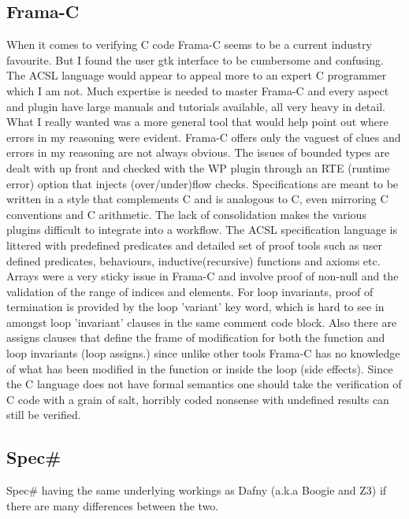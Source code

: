 \documentclass[10pt]{article} %
\begin{document}
\subsection{Frama-C}
	When it comes to verifying C code Frama-C seems to be a current industry favourite. But I found the user gtk interface to be cumbersome and confusing. The ACSL language would appear to appeal more to an expert C programmer which I am not. Much expertise is needed to master Frama-C and every aspect and plugin have large manuals and tutorials available, all very heavy in detail. What I really wanted was a more general tool that would help point out where errors in my reasoning were evident. Frama-C offers only the vaguest of clues and errors in my reasoning are not always obvious. The issues of bounded types are dealt with up front and checked with the WP plugin through an RTE (runtime error) option that injects (over\slash under)flow checks. Specifications are meant to be written in a style that complements C and is analogous to C, even mirroring C conventions and C arithmetic. The lack of consolidation makes the various plugins difficult to integrate into a workflow. The ACSL specification language is littered with predefined predicates and detailed set of proof tools such as user defined predicates, behaviours, inductive(recursive) functions and axioms etc. Arrays were a very sticky issue in Frama-C and involve proof of non-null and the validation of the range of indices and elements. For loop invariants, proof of termination is provided by the loop 'variant' key word, which is hard to see in amongst loop 'invariant' clauses in the same comment code block. Also there are assigns clauses that define the frame of modification for both the function and loop invariants (loop assigns.) since unlike other tools Frama-C has no knowledge of what has been modified in the function or inside the loop (side effects). Since the C language does not have formal semantics one should take the verification of C code with a grain of salt, horribly coded nonsense with undefined results can still be verified.
\subsection{Spec\#}
	Spec\# having the same underlying workings as Dafny (a.k.a Boogie and Z3) if there are many differences between the two.
\end{document}
